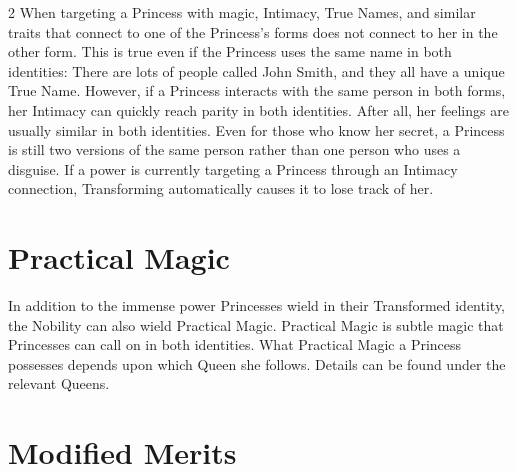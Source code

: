 \begin{multicols}{2}
When targeting a Princess with magic, Intimacy, True Names, and similar traits that connect to one of the Princess's forms does not connect to her in the other form. This is true even if the Princess uses the same name in both identities: There are lots of people called John Smith, and they all have a unique True Name. However, if a Princess interacts with the same person in both forms, her Intimacy can quickly reach parity in both identities. After all, her feelings are usually similar in both identities. Even for those who know her secret, a Princess is still two versions of the same person rather than one person who uses a disguise. If a power is currently targeting a Princess through an Intimacy connection, Transforming automatically causes it to lose track of her. 

\section*{Practical Magic}

In addition to the immense power Princesses wield in their Transformed identity, the Nobility can also wield Practical Magic. Practical Magic is subtle magic that Princesses can call on in both identities. What Practical Magic a Princess possesses depends upon which Queen she follows. Details can be found under the relevant Queens. 

\section*{Modified Merits}
\label{sec:Merits}


\end{multicols}
